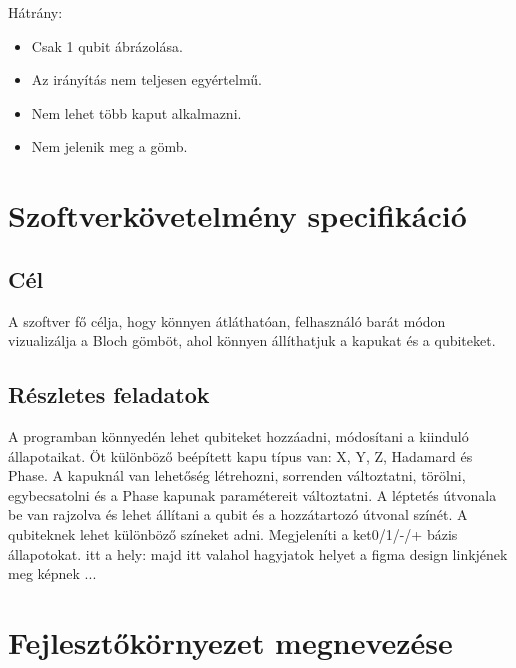 \documentclass[fontsize=12pt,a4paper]{article}
\begin{document}
Hátrány:

\begin{itemize}
    \item Csak 1 qubit ábrázolása.
    \item Az irányítás nem teljesen egyértelmű.
    \item Nem lehet több kaput alkalmazni.
    \item Nem jelenik meg a gömb.
\end{itemize}

\newpage
\section{Szoftverkövetelmény specifikáció}

\subsection{Cél}
A szoftver fő célja, hogy könnyen átláthatóan, felhasználó barát módon vizualizálja a Bloch gömböt, ahol könnyen állíthatjuk a kapukat és a qubiteket.

\subsection{Részletes feladatok}
A programban könnyedén lehet qubiteket hozzáadni, módosítani a kiinduló állapotaikat. Öt különböző beépített kapu típus van: X, Y, Z, Hadamard és Phase. A kapuknál van lehetőség létrehozni, sorrenden változtatni, törölni, egybecsatolni és a Phase kapunak paramétereit változtatni. A léptetés útvonala be van rajzolva és lehet állítani a qubit és a hozzátartozó útvonal színét. A qubiteknek lehet különböző színeket adni. Megjeleníti a ket0/1/-/+ bázis állapotokat. 
\newline
itt a hely: majd itt valahol hagyjatok helyet a figma design linkjének meg képnek
...

\newpage
\section{Fejlesztőkörnyezet megnevezése}
\end{document}
